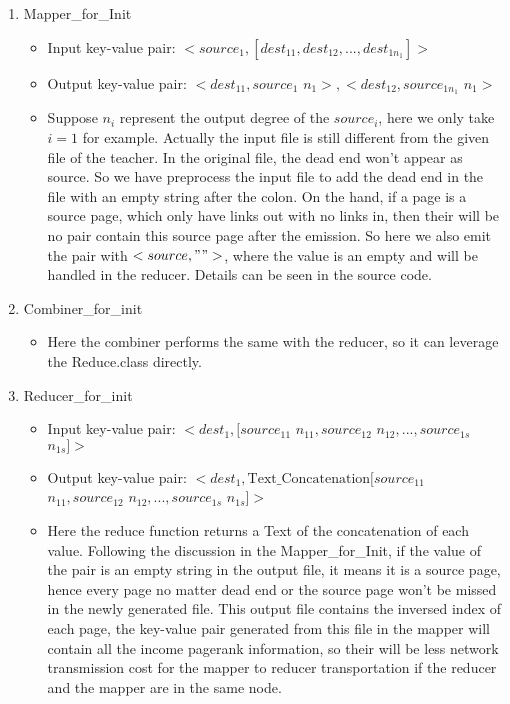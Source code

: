 \documentclass[a4paper]{article}
\begin{document}
\begin{enumerate}
	\item Mapper\_for\_Init
	\begin{itemize}
		\item Input key-value pair: $<source_1, [dest_{11}, dest_{12}, ..., dest_{1{n_1}}]>$
		\item Output key-value pair: $<dest_{11}, source_1$ $n_1>, <dest_{12}, source_{1{n_1}}$ $n_1>$
		\item Suppose $n_i$ represent the output degree of the $source_i$, here we only take $i = 1$ for example. Actually the input file is still different from the given file of the teacher. In the original file, the dead end won't appear as source. So we have preprocess the input file to add the dead end in the file with an empty string after the colon. On the hand, if a page is a source page, which only have links out with no links in, then their will be no pair contain this source page after the emission. So here we also emit the pair with $<source, "">$, where the value is an empty and will be handled in the reducer. Details can be seen in the source code.
	\end{itemize}
	\item Combiner\_for\_init
	\begin{itemize}
		\item Here the combiner performs the same with the reducer, so it can leverage the Reduce.class directly.
	\end{itemize}
	\item Reducer\_for\_init
	\begin{itemize}
		\item Input key-value pair: $<dest_1, [source_{11}$ $n_{11}, source_{12}$ $n_{12}, ..., source_{1s}$ $n_{1s}]>$
		\item Output key-value pair: $<dest_1, \mbox{Text\_Concatenation}[source_{11}$ $n_{11}, source_{12}$ $n_{12}, ..., source_{1s}$ $n_{1s}]>$
		\item Here the reduce function returns a Text of the concatenation of each value. Following the discussion in the Mapper\_for\_Init, if the value of the pair is an empty string in the output file, it means it is a source page, hence every page no matter dead end or the source page won't be missed in the newly generated file. This output file contains the inversed index of each page, the key-value pair generated from this file in the mapper will contain all the income pagerank information, so their will be less network transmission cost for the mapper to reducer transportation if the reducer and the mapper are in the same node.
	\end{itemize}
	

\end{enumerate}
\end{document}
